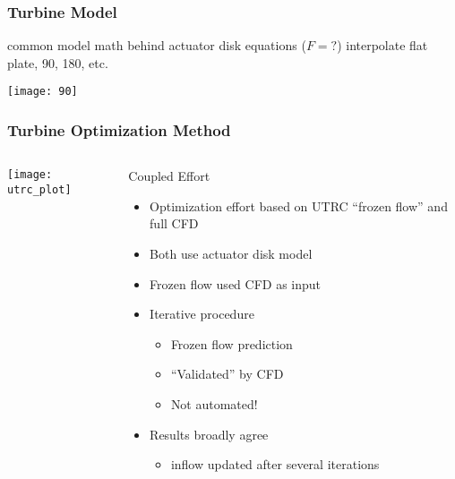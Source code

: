 \documentclass[mathserif]{beamer}
\begin{document}
%
%
%
\begin{frame}
 \frametitle{Turbine Model}

 common model
 math behind actuator disk equations ($F=?$)
 interpolate
 flat plate, 90, 180, etc.

   \begin{center}
    \texttt{[image: 90]}
   \end{center}

 
\end{frame}


%
%
\begin{frame}
 \frametitle{Turbine Optimization Method}

 \begin{columns}[]
  \begin{column}{0.45\linewidth}
   \begin{center}
    \texttt{[image: utrc\_plot]}
   \end{center}

  \end{column}
    \begin{column}{0.55\linewidth}

     \begin{block}{Coupled Effort}
     \begin{itemize}
      \item Optimization effort based on UTRC ``frozen flow''
	    and full CFD
      \item Both use actuator disk model
      \item Frozen flow used CFD as input
      \item Iterative procedure
	    \begin{itemize}
	     \item Frozen flow prediction 
	     \item ``Validated'' by CFD
	     \item Not automated!
	    \end{itemize}
      \item Results broadly agree
	    \begin{itemize}
	     \item inflow updated after several iterations
	    \end{itemize}
     \end{itemize}

      \end{block}
    \end{column}
 \end{columns}
\end{frame}
\end{document}

